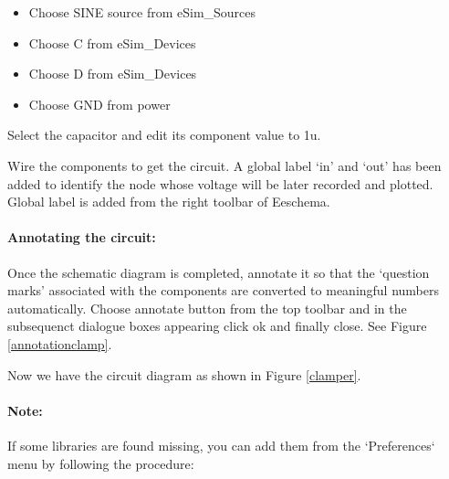 
\begin{itemize}
\item
Choose SINE source from eSim\_Sources
\item
Choose C from eSim\_Devices
\item
Choose D from eSim\_Devices
\item
Choose GND from power
\end{itemize}

Select the capacitor and edit its component value to 1u.%


Wire the components to get the circuit. A global label `in'  and `out' has been added to identify the node whose voltage will be later recorded and plotted. Global label is added from the right toolbar of Eeschema.

\paragraph{Annotating the circuit:} Once the schematic diagram is completed, annotate it so that the `question marks' associated with the components are converted to meaningful numbers automatically. Choose annotate button from the top toolbar and in the subsequenct dialogue boxes appearing click ok and finally close. See Figure \ref{annotationclamp}.




Now we have the circuit diagram as shown in Figure \ref{clamper}.


\paragraph{Note:} If some libraries are found missing, you can add them from the `Preferences` menu by following the procedure: 

